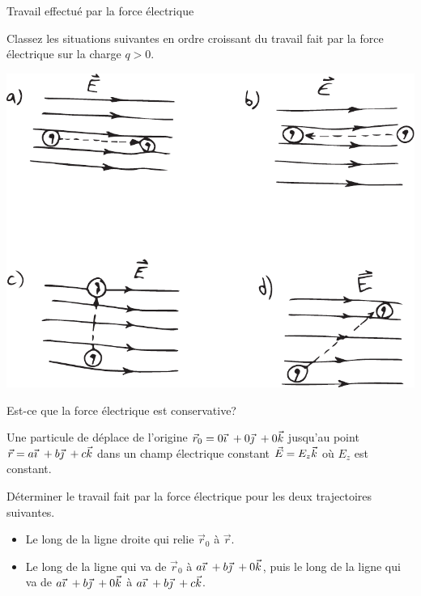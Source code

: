 \documentclass{beamer}
\begin{document}
\begin{frame}[t]{Travail effectué par la force électrique}

Classez les situations suivantes en ordre croissant du travail fait par la
force électrique sur la charge $q > 0$.

\begin{center}
  \includegraphics[scale=0.6]{figures/travail-force-electrique.pdf}
\end{center}

\end{frame}


\begin{frame}[t]{Est-ce que la force électrique est conservative?}

Une particule de déplace de l'origine $\vec{r}_0 = 0 \vec{\imath}\ + 0 \vec{\jmath}\ + 0 \vec{k}$ jusqu'au
point $\vec{r} = a \vec{\imath}\ + b \vec{\jmath}\ + c \vec{k}$ dans un champ électrique constant $\vec{E} =
E_z \vec{k}$ où $E_z$ est constant.

Déterminer le travail fait par la force électrique pour les deux trajectoires
suivantes.

\begin{itemize}
  \item Le long de la ligne droite qui relie $\vec{r}_0$ à $\vec{r}$.
  \item Le long de la ligne qui va de $\vec{r}_0$ à $a \vec{\imath}\ + b \vec{\jmath}\ + 0 \vec{k}$, puis le
    long de la ligne qui va de $a \vec{\imath}\ + b \vec{\jmath}\ + 0 \vec{k}$ à $a \vec{\imath}\ + b \vec{\jmath}\ + c \vec{k}$.
\end{itemize}

\end{frame}
\end{document}
